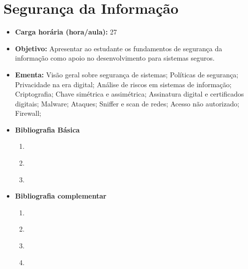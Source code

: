 \documentclass[
	10pt,				%
	openright,			%
	twoside,			%
	a4paper,			%
	english,			%
	french,				%
	brazil,				%
	sumario=tradicional
]{abntex2}
\begin{document}
\section*{Segurança da Informação}\label{6_seginfo}
\begin{itemize}
	\item \textbf{Carga horária (hora/aula):} 27
	\item \textbf{Objetivo:} Apresentar ao estudante os fundamentos de segurança da informação como apoio no desenvolvimento para sistemas seguros.
	\item \textbf{Ementa:} 
	Visão geral sobre segurança de sistemas;
	Políticas de segurança; 
	Privacidade na era digital;
	Análise de riscos em sistemas de informação;
	Criptografia; 
	Chave simétrica e assimétrica;
	Assinatura digital e certificados digitais; 
	Malware;
	Ataques;
	Sniffer e scan de redes;
	Acesso não autorizado;
	Firewall;
	\item \textbf{Bibliografia Básica}
	\begin{enumerate}
		\item \cite{cartilha2012}
		\item \cite{Stallings2014}
		\item \cite{Semola2014}
	\end{enumerate}
	\item \textbf{Bibliografia complementar}
	\begin{enumerate}
		\item \cite{Carvalho2005}
		\item \cite{Fontes2017}
		\item \cite{Guimaraes2006}
		\item \cite{Giavaroto2013}
	\end{enumerate} 	
\end{itemize}


\newpage
\end{document}
